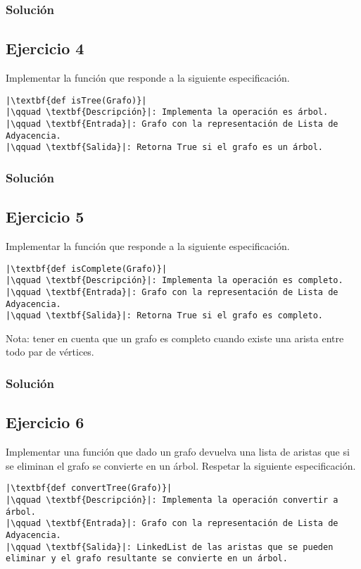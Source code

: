 \documentclass{article}
\begin{document}
\subsubsection*{Solución}


\subsection*{Ejercicio 4}
Implementar la función que responde a la siguiente especificación.
\begin{lstlisting}
|\textbf{def isTree(Grafo)}|
|\qquad \textbf{Descripción}|: Implementa la operación es árbol.
|\qquad \textbf{Entrada}|: Grafo con la representación de Lista de Adyacencia.
|\qquad \textbf{Salida}|: Retorna True si el grafo es un árbol.
\end{lstlisting}
\subsubsection*{Solución}


\subsection*{Ejercicio 5}
Implementar la función que responde a la siguiente especificación.
\begin{lstlisting}
|\textbf{def isComplete(Grafo)}|
|\qquad \textbf{Descripción}|: Implementa la operación es completo.
|\qquad \textbf{Entrada}|: Grafo con la representación de Lista de Adyacencia.
|\qquad \textbf{Salida}|: Retorna True si el grafo es completo.
\end{lstlisting}
Nota: tener en cuenta que un grafo es completo cuando existe una arista entre todo par de vértices.
\subsubsection*{Solución}


\subsection*{Ejercicio 6}
Implementar una función que dado un grafo devuelva una lista de aristas que si se eliminan el grafo se convierte en un árbol. Respetar la siguiente especificación.
\begin{lstlisting}
|\textbf{def convertTree(Grafo)}|
|\qquad \textbf{Descripción}|: Implementa la operación convertir a árbol.
|\qquad \textbf{Entrada}|: Grafo con la representación de Lista de Adyacencia.
|\qquad \textbf{Salida}|: LinkedList de las aristas que se pueden eliminar y el grafo resultante se convierte en un árbol.
\end{lstlisting}
\end{document}
